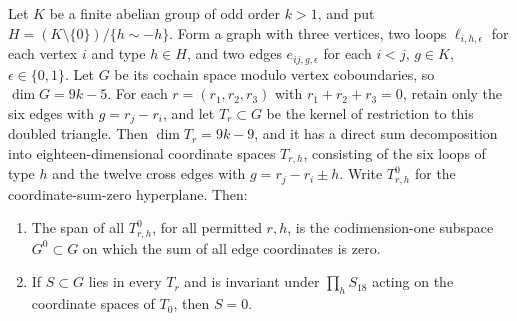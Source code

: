 \begin{lemma}
\label{lem:three-theta-odd-labelled-graph-candidate}
Let $K$ be a finite abelian group of odd order $k>1$, and put
$H=(K\setminus\{0\})/\{h\sim-h\}$. Form a graph with three vertices,
two loops $\ell_{i,h,\epsilon}$ for each vertex $i$ and type $h\in H$,
and two edges $e_{ij,g,\epsilon}$ for each $i<j$, $g\in K$,
$\epsilon\in\{0,1\}$. Let $G$ be its cochain space modulo vertex
coboundaries, so $\dim G=9k-5$.
For each $r=(r_1,r_2,r_3)$ with $r_1+r_2+r_3=0$, retain only the
six edges with $g=r_j-r_i$, and let $T_r\subset G$ be the kernel
of restriction to this doubled triangle. Then $\dim T_r=9k-9$,
and it has a direct sum decomposition into eighteen-dimensional
coordinate spaces $T_{r,h}$, consisting of the six loops of type
$h$ and the twelve cross edges with $g=r_j-r_i\pm h$.
Write $T_{r,h}^0$ for the coordinate-sum-zero hyperplane.
Then:
\begin{enumerate}
\item The span of all $T_{r,h}^0$, for all permitted $r,h$, is the
codimension-one subspace $G^0\subset G$ on which the sum of all edge
coordinates is zero.
\item If $S\subset G$ lies in every $T_r$ and is invariant under
$\prod_h S_{18}$ acting on the coordinate spaces of $T_0$, then $S=0$.
\end{enumerate}
\end{lemma}
